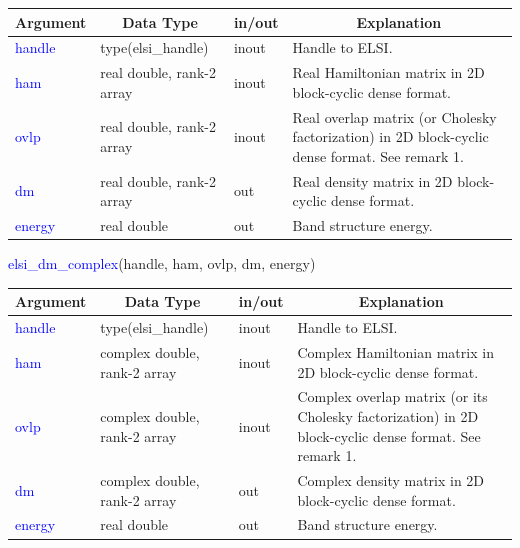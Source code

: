 \documentclass{report}
\begin{document}
\begin{tabular}[]{|p{20mm}|p{45mm}|p{15mm}|p{85mm}|}
\hline
\multicolumn{1}{|c|}{\textbf{Argument}} & \multicolumn{1}{c|}{\textbf{Data Type}} & \multicolumn{1}{c|}{\textbf{in/out}} & \multicolumn{1}{c|}{\textbf{Explanation}}\\
\hline
\textcolor{blue}{handle} & type(elsi\_handle)        & inout & Handle to ELSI.\\
\hline
\textcolor{blue}{ham}    & real double, rank-2 array & inout & Real Hamiltonian matrix in 2D block-cyclic dense format.\\
\hline
\textcolor{blue}{ovlp}   & real double, rank-2 array & inout & Real overlap matrix (or Cholesky factorization) in 2D block-cyclic dense format. See remark 1.\\
\hline
\textcolor{blue}{dm}     & real double, rank-2 array & out   & Real density matrix in 2D block-cyclic dense format.\\
\hline
\textcolor{blue}{energy} & real double               & out   & Band structure energy.\\
\hline
\end{tabular}

\begin{labeling}{\hspace{6cm}}
\item [\hspace{0.3cm} \textcolor{blue}{elsi\_dm\_complex}(handle, ham, ovlp, dm, energy)]
\end{labeling}

\begin{tabular}[]{|p{20mm}|p{45mm}|p{15mm}|p{85mm}|}
\hline
\multicolumn{1}{|c|}{\textbf{Argument}} & \multicolumn{1}{c|}{\textbf{Data Type}} & \multicolumn{1}{c|}{\textbf{in/out}} & \multicolumn{1}{c|}{\textbf{Explanation}}\\
\hline
\textcolor{blue}{handle} & type(elsi\_handle)           & inout & Handle to ELSI.\\
\hline
\textcolor{blue}{ham}    & complex double, rank-2 array & inout & Complex Hamiltonian matrix in 2D block-cyclic dense format.\\
\hline
\textcolor{blue}{ovlp}   & complex double, rank-2 array & inout & Complex overlap matrix (or its Cholesky factorization) in 2D block-cyclic dense format. See remark 1.\\
\hline
\textcolor{blue}{dm}     & complex double, rank-2 array & out   & Complex density matrix in 2D block-cyclic dense format.\\
\hline
\textcolor{blue}{energy} & real double                  & out   & Band structure energy.\\
\hline
\end{tabular}
\end{document}

